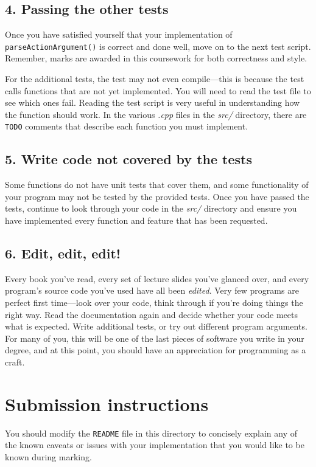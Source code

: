 \documentclass[a4paper]{article}
\begin{document}
\subsection*{4. Passing the other tests}\label{sec:tasks more-tests}
Once you have satisfied yourself that your implementation of \texttt{parseActionArgument()} is correct and done well, move on to the next test script. Remember, marks are awarded in this coursework for both correctness and style. 

For the additional tests, the test may not even compile---this is because the test calls functions that are not yet implemented. You will need to read the test file to see which ones fail. Reading the test script is very useful in understanding how the function should work. In the various \emph{.cpp} files in the \emph{src/} directory, there are \texttt{TODO} comments that describe each function you must implement.


\subsection*{5. Write code not covered by the tests}\label{sec:tasks untested-code}
Some functions do not have unit tests that cover them, and some functionality of your program may not be tested by the provided tests. Once you have passed the tests, continue to look through your code in the \emph{src/} directory and ensure you have implemented every function and feature that has been requested. 


\subsection*{6. Edit, edit, edit!}\label{sec:tasks edit}
Every book you've read, every set of lecture slides you've glanced over, and every program's source code you've used have all been \emph{edited}. Very few programs are perfect first time—look over your code, think through if you're doing things the right way. Read the documentation again and decide whether your code meets what is expected. Write additional tests, or try out different program arguments. For many of you, this will be one of the last pieces of software you write in your degree, and at this point, you should have an appreciation for programming as a craft.



\section*{Submission instructions}
You should modify the \texttt{README} file in this directory to concisely explain any of the known caveats or issues with your implementation that you would like to be known during marking.
\end{document}
